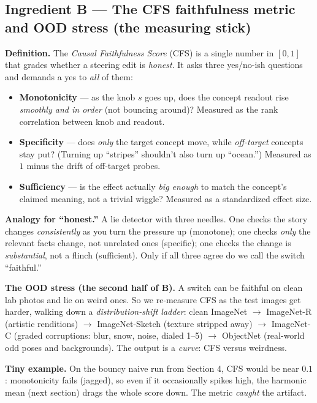 \documentclass[12pt]{article}
\newcommand{\dlabel}[1]{\textbf{\textcolor{accent}{#1}}\;}
\newcommand{\offm}[1]{\textcolor{offman}{#1}}
\begin{document}
\subsection{Ingredient B --- The CFS faithfulness metric and OOD stress (the measuring stick)}

\dlabel{Definition.} The \emph{Causal Faithfulness Score} (CFS) is a single number in $[0,1]$ that grades whether a steering edit is \emph{honest}. It asks three yes/no-ish questions and demands a yes to \emph{all} of them:
\begin{itemize}[leftmargin=1.4em, itemsep=2pt]
  \item \textbf{Monotonicity} --- as the knob $s$ goes up, does the concept readout rise \emph{smoothly and in order} (not bouncing around)? Measured as the rank correlation between knob and readout.
  \item \textbf{Specificity} --- does \emph{only} the target concept move, while \emph{off-target} concepts stay put? (Turning up ``stripes'' shouldn't also turn up ``ocean.'') Measured as $1$ minus the drift of off-target probes.
  \item \textbf{Sufficiency} --- is the effect actually \emph{big enough} to match the concept's claimed meaning, not a trivial wiggle? Measured as a standardized effect size.
\end{itemize}

\dlabel{Analogy for ``honest.''} A lie detector with three needles. One checks the story changes \emph{consistently} as you turn the pressure up (monotone); one checks \emph{only} the relevant facts change, not unrelated ones (specific); one checks the change is \emph{substantial}, not a flinch (sufficient). Only if all three agree do we call the switch ``faithful.''

\dlabel{The OOD stress (the second half of B).} A switch can be faithful on clean lab photos and lie on weird ones. So we re-measure CFS as the test images get harder, walking down a \emph{distribution-shift ladder}: clean ImageNet $\to$ ImageNet-R (artistic renditions) $\to$ ImageNet-Sketch (texture stripped away) $\to$ ImageNet-C (graded corruptions: blur, snow, noise, dialed 1--5) $\to$ ObjectNet (real-world odd poses and backgrounds). The output is a \emph{curve}: CFS versus weirdness.

\dlabel{Tiny example.} On the bouncy naive run from Section 4, CFS would be near \offm{$0.1$}: monotonicity fails (jagged), so even if it occasionally spikes high, the harmonic mean (next section) drags the whole score down. The metric \emph{caught} the artifact.
\end{document}
